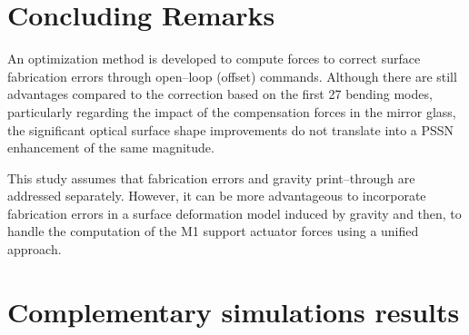 \documentclass{gmto}
\begin{document}



\section{Concluding Remarks}
\label{sec:conclusions}


An optimization method is developed to compute forces to correct surface fabrication errors through open--loop (offset) commands. Although there are still advantages compared to the correction based on the first 27 bending modes, particularly regarding the impact of the compensation forces in the mirror glass, the significant optical surface shape improvements do not translate into a PSSN enhancement of the same magnitude.


This study assumes that fabrication errors and gravity print--through are addressed separately. However, it can be more advantageous to incorporate fabrication errors in a surface deformation model induced by gravity and then, to handle the computation of the M1 support actuator forces using a unified approach.


\printbibliography

\clearpage \newpage

\appendix


\section{Complementary simulations results}
\label{sec:alternative_tuning_res}
\end{document}
